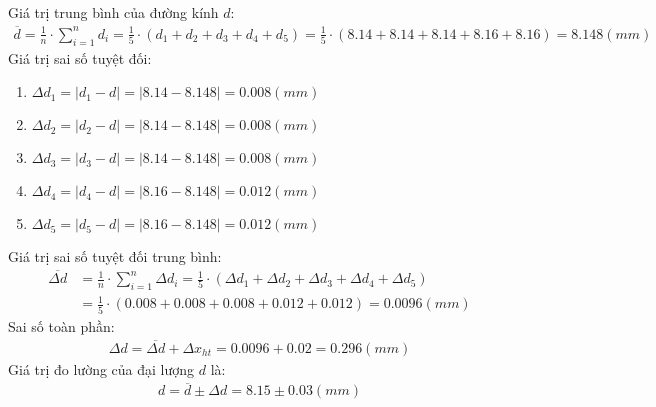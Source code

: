 \documentclass{article}
\begin{document}
Giá trị trung bình của đường kính $d$:
\begin{align*}
    \overline{d} = \frac{1}{n}\cdot\sum_{i = 1}^{n}d_i = \frac{1}{5}\cdot(d_1 + d_2 + d_3 + d_4 + d_5) = \frac{1}{5}\cdot(8.14 + 8.14 + 8.14 + 8.16 + 8.16) = 8.148(mm)
\end{align*}
Giá trị sai số tuyệt đối:
\begin{enumerate}
    \item $\Delta d_1 = |d_1 - d| = |8.14 - 8.148| = 0.008(mm)$
    \item $\Delta d_2 = |d_2 - d| = |8.14 - 8.148| = 0.008(mm)$
    \item $\Delta d_3 = |d_3 - d| = |8.14 - 8.148| = 0.008(mm)$
    \item $\Delta d_4 = |d_4 - d| = |8.16 - 8.148| = 0.012(mm)$
    \item $\Delta d_5 = |d_5 - d| = |8.16 - 8.148| = 0.012(mm)$
\end{enumerate}
Giá trị sai số tuyệt đối trung bình:
\begin{align*}
    \overline{\Delta d} &= \frac{1}{n}\cdot\sum_{i=1}^{n}\Delta d_i = \frac{1}{5}\cdot(\Delta d_1 + \Delta d_2 + \Delta d_3 + \Delta d_4 + \Delta d_5)\\ 
    &=  \frac{1}{5}\cdot(0.008 + 0.008 + 0.008 + 0.012 + 0.012) = 0.0096(mm)
\end{align*}
Sai số toàn phần:
\begin{align*}
    \Delta d = \overline{\Delta d} + \Delta x_{ht} =0.0096 + 0.02 =0.296(mm) 
\end{align*}
Giá trị đo lường của đại lượng $d$ là:
\begin{align*}
    d = \overline{d} \pm \Delta d = 8.15 \pm 0.03(mm)
\end{align*}
\end{document}
